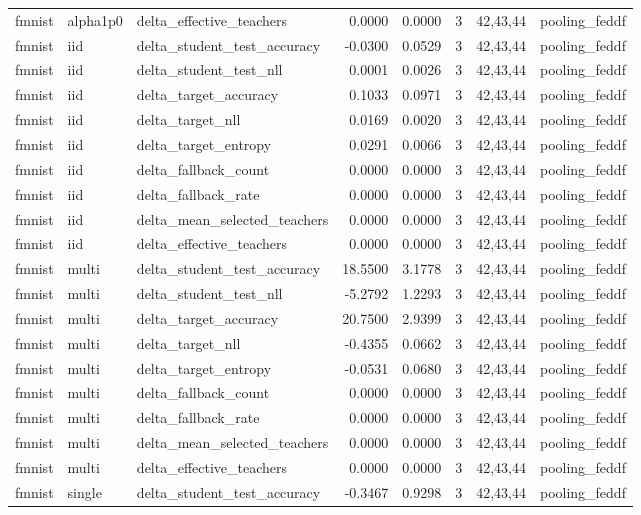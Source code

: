 \begin{tabular}{lllrrrll}
fmnist & alpha1p0 & delta\_effective\_teachers & 0.0000 & 0.0000 & 3 & 42,43,44 & pooling\_feddf \\
fmnist & iid & delta\_student\_test\_accuracy & -0.0300 & 0.0529 & 3 & 42,43,44 & pooling\_feddf \\
fmnist & iid & delta\_student\_test\_nll & 0.0001 & 0.0026 & 3 & 42,43,44 & pooling\_feddf \\
fmnist & iid & delta\_target\_accuracy & 0.1033 & 0.0971 & 3 & 42,43,44 & pooling\_feddf \\
fmnist & iid & delta\_target\_nll & 0.0169 & 0.0020 & 3 & 42,43,44 & pooling\_feddf \\
fmnist & iid & delta\_target\_entropy & 0.0291 & 0.0066 & 3 & 42,43,44 & pooling\_feddf \\
fmnist & iid & delta\_fallback\_count & 0.0000 & 0.0000 & 3 & 42,43,44 & pooling\_feddf \\
fmnist & iid & delta\_fallback\_rate & 0.0000 & 0.0000 & 3 & 42,43,44 & pooling\_feddf \\
fmnist & iid & delta\_mean\_selected\_teachers & 0.0000 & 0.0000 & 3 & 42,43,44 & pooling\_feddf \\
fmnist & iid & delta\_effective\_teachers & 0.0000 & 0.0000 & 3 & 42,43,44 & pooling\_feddf \\
fmnist & multi & delta\_student\_test\_accuracy & 18.5500 & 3.1778 & 3 & 42,43,44 & pooling\_feddf \\
fmnist & multi & delta\_student\_test\_nll & -5.2792 & 1.2293 & 3 & 42,43,44 & pooling\_feddf \\
fmnist & multi & delta\_target\_accuracy & 20.7500 & 2.9399 & 3 & 42,43,44 & pooling\_feddf \\
fmnist & multi & delta\_target\_nll & -0.4355 & 0.0662 & 3 & 42,43,44 & pooling\_feddf \\
fmnist & multi & delta\_target\_entropy & -0.0531 & 0.0680 & 3 & 42,43,44 & pooling\_feddf \\
fmnist & multi & delta\_fallback\_count & 0.0000 & 0.0000 & 3 & 42,43,44 & pooling\_feddf \\
fmnist & multi & delta\_fallback\_rate & 0.0000 & 0.0000 & 3 & 42,43,44 & pooling\_feddf \\
fmnist & multi & delta\_mean\_selected\_teachers & 0.0000 & 0.0000 & 3 & 42,43,44 & pooling\_feddf \\
fmnist & multi & delta\_effective\_teachers & 0.0000 & 0.0000 & 3 & 42,43,44 & pooling\_feddf \\
fmnist & single & delta\_student\_test\_accuracy & -0.3467 & 0.9298 & 3 & 42,43,44 & pooling\_feddf \\

\end{tabular}
